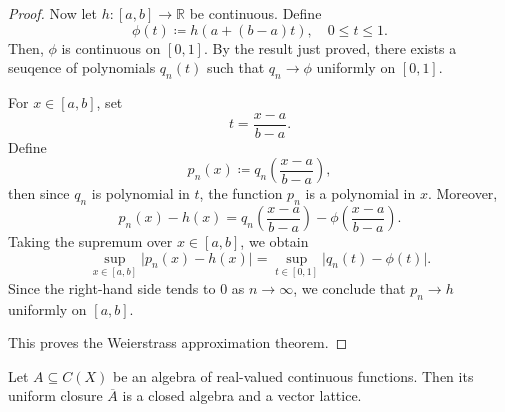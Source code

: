 \begin{proof}
    Now let \(h: [a, b] \to \mathbb{R}\) be continuous. Define 
    \[
        \phi (t) \coloneqq h(a + (b - a)t), \quad 0 \le t \le 1.
    \] 
    Then, \(\phi \) is continuous on \([0, 1]\). By the result just proved, there exists a seuqence of polynomials \(q_n(t)\) such that \(q_n \to \phi\) uniformly on \([0, 1]\). 

    For \(x \in [a, b]\), set 
    \[
        t = \frac{x - a}{b - a}.
    \]      
    Define 
    \[
        p_n(x) \coloneqq q_n \left( \frac{x-a}{b-a} \right), 
    \]
    then since \(q_n\) is polynomial in \(t\), the function \(p_n\) is a polynomial in \(x\). Moreover, 
    \[
        p_n(x) - h(x) = q_n \left( \frac{x-a}{b-a} \right) - \phi \left( \frac{x-a}{b-a} \right).  
    \]   
    Taking the supremum over \(x \in [a, b]\), we obtain 
    \[
        \sup _{x \in [a, b]} \vert p_n(x) - h(x) \vert = \sup _{t \in [0, 1]} \vert q_n(t) - \phi (t) \vert.  
    \]
    Since the right-hand side tends to \(0\) as \(n \to \infty\), we conclude that \(p_n \to h\) uniformly on \([a, b]\). 
    
    This proves the Weierstrass approximation theorem.    
\end{proof}

\begin{lemma} \label{lm: algebra uniform closure is a closed algebra and vector lattice}
    Let \(A \subseteq C(X)\) be an algebra of real-valued continuous functions. Then its uniform closure \(\overline{A}\) is a closed algebra and a vector lattice.  
\end{lemma}

